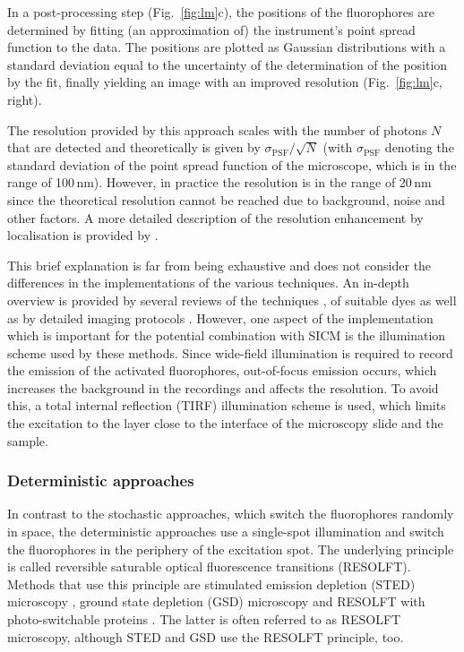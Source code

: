 In a post-processing step (Fig.~\ref{fig:lm}c), the positions of the
fluorophores are determined by fitting (an approximation of) the instrument's
point spread function to the data. The positions are plotted as Gaussian
distributions with a standard deviation equal to the uncertainty of the
determination of the position by the fit, finally yielding an image with an
improved resolution (Fig.~\ref{fig:lm}c, right).

The resolution provided by this approach scales with the number of photons $N$
that are detected and theoretically is given by $\sigma_\text{PSF}/\sqrt{N}$
(with $\sigma_\text{PSF}$ denoting the standard deviation of the point spread
function of the microscope, which is in the range of 100\,nm). However, in
practice the resolution is in the range of 20\,nm \cite{Betzig2006,Rust2006}
since the theoretical resolution cannot be reached due to background, noise
and other factors. A more detailed description of the resolution enhancement
by localisation is provided by \cite{Mortensen2010}. 

This brief explanation is far from being exhaustive and does not consider the
differences in the implementations of the various techniques. An in-depth
overview is provided by several reviews of the techniques
\cite{Patterson2010,Sengupta2014,Liu2015,Sauer2017}, of suitable dyes 
\cite{Li2018a} as well as by detailed imaging protocols
\cite{Gould2009,Schermelleh2010,Linde2011}. However, one aspect of the
implementation which is important for the potential combination with SICM is
the illumination scheme used by these methods. Since wide-field illumination
is required to record the emission of the activated fluorophores, out-of-focus
emission occurs, which increases the background in the recordings and affects
the resolution. To avoid this, a total internal reflection (TIRF) illumination
scheme \cite{AMBROSE1956,Axelrod1981} is used, which limits the excitation to
the layer close to the interface of the microscopy slide and the sample.   


\subsubsection{Deterministic approaches}
\label{sec:deterministic-approaches}
In contrast to the stochastic approaches, which switch the fluorophores
randomly in space, the deterministic approaches use a single-spot illumination
and switch the fluorophores in the periphery of the excitation spot. The
underlying principle is called reversible saturable optical fluorescence
transitions (RESOLFT). Methods that use this principle are stimulated emission
depletion (STED) microscopy \cite{hell+wichmann,Klar2000}, ground state
depletion (GSD) microscopy \cite{Hell1995,Bretschneider2007} and RESOLFT with
photo-switchable proteins \cite{Hofmann2005}. The latter is often referred to
as RESOLFT microscopy, although STED and GSD use the RESOLFT principle, too. 

